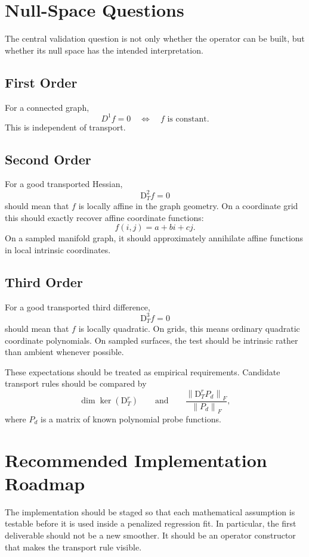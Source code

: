 \documentclass[11pt]{article}
\newcommand{\D}{\mathrm D}
\newcommand{\norm}[1]{\left\lVert #1 \right\rVert}
\begin{document}
\section{Null-Space Questions}

The central validation question is not only whether the operator can be built,
but whether its null space has the intended interpretation.

\subsection{First Order}

For a connected graph,
\[
  D^1f=0
  \quad\Longleftrightarrow\quad
  f \text{ is constant}.
\]
This is independent of transport.

\subsection{Second Order}

For a good transported Hessian,
\[
  \D_T^2 f=0
\]
should mean that \(f\) is locally affine in the graph geometry.  On a coordinate
grid this should exactly recover affine coordinate functions:
\[
  f(i,j)=a+bi+cj.
\]
On a sampled manifold graph, it should approximately annihilate affine
functions in local intrinsic coordinates.

\subsection{Third Order}

For a good transported third difference,
\[
  \D_T^3 f=0
\]
should mean that \(f\) is locally quadratic.  On grids, this means ordinary
quadratic coordinate polynomials.  On sampled surfaces, the test should be
intrinsic rather than ambient whenever possible.

These expectations should be treated as empirical requirements.  Candidate
transport rules should be compared by
\[
  \dim\ker(\D_T^r)
  \qquad\text{and}\qquad
  \frac{\norm{\D_T^r P_d}_F}{\norm{P_d}_F},
\]
where \(P_d\) is a matrix of known polynomial probe functions.

\section{Recommended Implementation Roadmap}

The implementation should be staged so that each mathematical assumption is
testable before it is used inside a penalized regression fit.  In particular,
the first deliverable should not be a new smoother.  It should be an operator
constructor that makes the transport rule visible.
\end{document}

